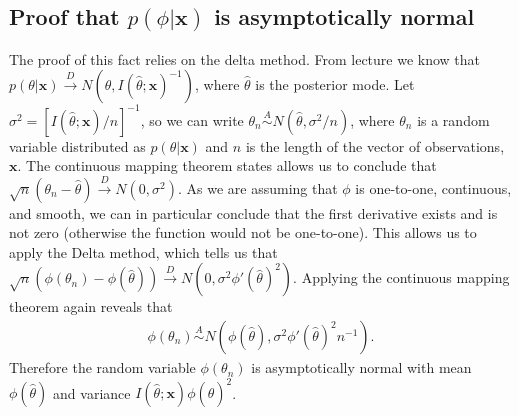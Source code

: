 \documentclass[a4paper,10pt]{article}
\newcommand{\bx}{\mathbf{x}}
\begin{document}
\subsection{Proof that $p(\phi|\bx)$ is asymptotically normal}
The proof of this fact relies on the delta method. From lecture we know that $p(\theta|\bx) \overset{D}{\rightarrow} N(\hat{\theta}, I(\hat{\theta};\bx)^{-1})$, where $\hat{\theta}$ is the posterior mode.  Let $\sigma^{2}=[I(\hat{\theta};\bx)/n]^{-1}$, so we can write $\theta_{n} \overset{A}{\sim} N(\hat{\theta}, \sigma^{2}/n)$, where $\theta_{n}$ is a random variable distributed as $p(\theta|\bx)$ and $n$ is the length of the vector of observations, $\bx$.   The continuous mapping theorem states allows us to conclude that $\sqrt{n}(\theta_{n}-\hat{\theta}) \overset{D}{\rightarrow} N(0, \sigma^{2})$.  As we are assuming that $\phi$ is one-to-one, continuous, and smooth, we can in particular conclude that the first derivative exists and is not zero (otherwise the function would not be one-to-one).  This allows us to apply the Delta method, which tells us that $\sqrt{n}(\phi(\theta_{n})-\phi(\hat{\theta})) \overset{D}{\rightarrow} N(0, \sigma^{2}\phi'(\hat{\theta})^{2})$.  Applying the continuous mapping theorem again reveals that
\begin{align*}
\phi(\theta_{n}) \overset{A}{\sim} N(\phi(\hat{\theta}), \sigma^{2}\phi'(\hat{\theta})^{2}n^{-1}).
\end{align*}
Therefore the random variable $\phi(\theta_{n})$ is asymptotically normal with mean $\phi(\hat{\theta})$ and variance $I(\hat{\theta};\bx)\phi(\hat{\theta})^{2}$.  
\end{document}
